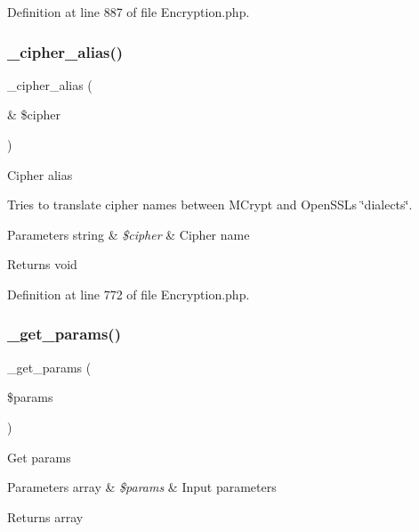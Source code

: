 Definition at line 887 of file Encryption.\+php.

\mbox{\label{class_c_i___encryption_a2b585f447a6282e702dd3153baf3d68f}} 
\subsubsection{\texorpdfstring{\_cipher\_alias()}{\_cipher\_alias()}}
{\footnotesize\ttfamily \+\_\+cipher\+\_\+alias (\begin{DoxyParamCaption}\item[{\&}]{\$cipher }\end{DoxyParamCaption})\hspace{0.3cm}{\ttfamily [protected]}}

Cipher alias

Tries to translate cipher names between M\+Crypt and Open\+S\+SL\textquotesingle{}s \char`\"{}dialects\char`\"{}.


\begin{DoxyParams}[1]{Parameters}
string & {\em \$cipher} & Cipher name \\
\hline
\end{DoxyParams}
\begin{DoxyReturn}{Returns}
void 
\end{DoxyReturn}


Definition at line 772 of file Encryption.\+php.

\mbox{\label{class_c_i___encryption_ab5bb04b4151b23afd9dccad358b3967b}} 
\subsubsection{\texorpdfstring{\_get\_params()}{\_get\_params()}}
{\footnotesize\ttfamily \+\_\+get\+\_\+params (\begin{DoxyParamCaption}\item[{}]{\$params }\end{DoxyParamCaption})\hspace{0.3cm}{\ttfamily [protected]}}

Get params


\begin{DoxyParams}[1]{Parameters}
array & {\em \$params} & Input parameters \\
\hline
\end{DoxyParams}
\begin{DoxyReturn}{Returns}
array 
\end{DoxyReturn}


